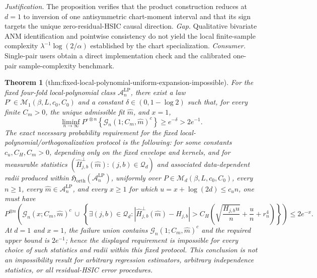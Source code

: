 \documentclass{article}
\newtheorem{theorem}{Theorem}
\begin{document}
\par\smallskip\noindent \textit{Justification.} The proposition verifies that the product construction reduces at \(d=1\) to inversion of one antisymmetric chart-moment interval and that its sign targets the unique zero-residual-HSIC causal direction. \textit{Gap.} Qualitative bivariate ANM identification and pointwise consistency do not yield the local finite-sample complexity \(\lambda^{-1}\log(2/\alpha)\) established by the chart specialization. \textit{Consumer.} Single-pair users obtain a direct implementation check and the calibrated one-pair sample-complexity benchmark.

\begin{theorem}[thm:fixed-local-polynomial-uniform-expansion-impossible]\label{thm:fixed-local-polynomial-uniform-expansion-impossible}
For the fixed four-fold local-polynomial class \(\mathcal A_n^{\mathrm{LP}}\), there exist a law \(P^\circ\in\mathcal M_1(\beta,L,c_0,C_0)\) and a constant \(\delta\in(0,1-\log 2)\) such that, for every finite \(C_m>0\), the unique admissible fit \(\widehat m\), and \(x=1\),
\[
\liminf_{n\to\infty}P^{\circ\otimes n}\!\left\{\mathcal G_n(1;C_m,\widehat m)^c\right\}\ge e^{-\delta}>2e^{-1}.
\]
The exact necessary probability requirement for the fixed local-polynomial/orthogonalization protocol is the following: for some constants \(c_u,C_H,C_m>0\), depending only on the fixed envelope and kernels, and for measurable statistics \((\widehat H^\perp_{j,b}(\widehat m):(j,b)\in\mathcal Q_d)\) and associated data-dependent radii produced within \(\mathfrak H_{\mathrm{orth}}(\mathcal A_n^{\mathrm{LP}})\), uniformly over \(P\in\mathcal M_d(\beta,L,c_0,C_0)\), every \(n\ge1\), every \(\widehat m\in\mathcal A_n^{\mathrm{LP}}\), and every \(x\ge1\) for which \(u=x+\log(2d)\le c_u n\), one must have
\[
P^{\otimes n}\!\left(
\mathcal G_n(x;C_m,\widehat m)^c
\ \cup\
\left\{\exists(j,b)\in\mathcal Q_d:
\left|\widehat H^\perp_{j,b}(\widehat m)-H_{j,b}\right|
>C_H\left(\sqrt{\frac{H_{j,b}u}{n}}+\frac{u}{n}+r_n^4\right)
\right\}
\right)\le2e^{-x}.
\]
At \(d=1\) and \(x=1\), the failure union contains \(\mathcal G_n(1;C_m,\widehat m)^c\) and the required upper bound is \(2e^{-1}\); hence the displayed requirement is impossible for every choice of such statistics and radii within this fixed protocol. This conclusion is not an impossibility result for arbitrary regression estimators, arbitrary independence statistics, or all residual-HSIC error procedures.
\end{theorem}
\end{document}
